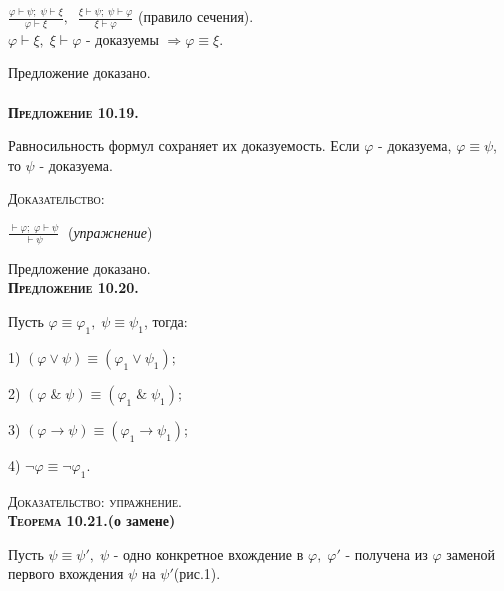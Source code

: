 \documentclass[18pt, a4paper]{extarticle}
\newcommand{\ampersand}{\;\&\;}
\newcommand{\dokup}{\textsc{Доказательство: упражнение.}}
\begin{document}
$\displaystyle \frac{\varphi\vdash\psi;\;\psi\vdash\xi}{\varphi\vdash\xi},\;\;\frac{\xi\vdash\psi;\;\psi\vdash\varphi}{\xi\vdash\varphi}$ (правило сечения).\\

$\varphi\vdash\xi,\;\xi\vdash\varphi$ -  доказуемы $\Rightarrow \varphi\equiv\xi$.

Предложение доказано.\\\\

\textbf{\textsc{Предложение 10.19.}} 

Равносильность формул сохраняет их доказуемость. Если $\varphi$ -  доказуема, $\varphi\equiv\psi$, то $\psi$ -  доказуема.

\textsc{Доказательство:}

$\displaystyle \frac{\vdash\varphi;\;\varphi\vdash\psi}{\vdash\psi}\;$ (\textit{упражнение})

Предложение доказано.\\

\textbf{\textsc{Предложение 10.20.}} 

Пусть $\varphi\equiv\varphi_1,\;\psi\equiv\psi_1$, тогда:

1) $(\varphi\vee\psi)\equiv(\varphi_1\vee\psi_1);$

2) $(\varphi\ampersand\psi)\equiv(\varphi_1\ampersand\psi_1);$

3) $(\varphi\to\psi)\equiv(\varphi_1\to\psi_1);$

4) $\lnot\varphi\equiv\lnot\varphi_1$.

\dokup\\

\textbf{\textsc{Теорема 10.21.}(о замене)} 

Пусть $\psi\equiv\psi',\;\psi$ -  одно конкретное вхождение в $\varphi,\;\varphi'$ -  получена из $\varphi$ заменой первого вхождения $\psi$ на $\psi'$(рис.1). 
\end{document}
